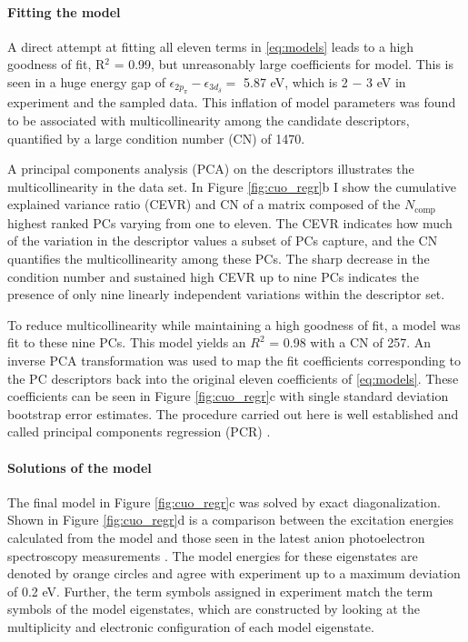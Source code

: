 \documentclass[12pt]{article}
\begin{document}
\vspace{-10pt}
\paragraph{Fitting the model}
A direct attempt at fitting all eleven terms in \eqref{eq:models} leads to a high goodness of fit, R$^2$ = 0.99, but unreasonably large coefficients for model.
This is seen in a huge energy gap of $\epsilon_{2p_\pi} - \epsilon_{3d_\delta} = $ 5.87 eV, which is 2 $-$ 3 eV in experiment and the sampled data.
This inflation of model parameters was found to be associated with multicollinearity among the candidate descriptors, quantified by a large condition number (CN) of 1470.

A principal components analysis (PCA) on the descriptors illustrates the multicollinearity in the data set.
In Figure \eqref{fig:cuo_regr}b I show the cumulative explained variance ratio (CEVR) and CN of a matrix composed of the $N_\text{comp}$ highest ranked PCs varying from one to eleven.
The CEVR indicates how much of the variation in the descriptor values a subset of PCs capture, and the CN quantifies the multicollinearity among these PCs.
The sharp decrease in the condition number and sustained high CEVR up to nine PCs indicates the presence of only nine linearly independent variations within the descriptor set.

To reduce multicollinearity while maintaining a high goodness of fit, a model was fit to these nine PCs.
This model yields an $R^2$ = 0.98 with a CN of 257.
An inverse PCA transformation was used to map the fit coefficients corresponding to the PC descriptors back into the original eleven coefficients of \eqref{eq:models}.
These coefficients can be seen in Figure \ref{fig:cuo_regr}c with single standard deviation bootstrap error estimates.
The procedure carried out here is well established and called principal components regression (PCR) \cite{10.2307/2348005}.

\vspace{-10pt}
\paragraph{Solutions of the model}
The final model in Figure \ref{fig:cuo_regr}c was solved by exact diagonalization.
Shown in Figure \ref{fig:cuo_regr}d is a comparison between the excitation energies calculated from the model and those seen in the latest anion photoelectron spectroscopy measurements \cite{Wu1997}.
The model energies for these eigenstates are denoted by orange circles and agree with experiment up to a maximum deviation of 0.2 eV.
Further, the term symbols assigned in experiment match the term symbols of the model eigenstates, which are constructed by looking at the multiplicity and electronic configuration of each model eigenstate. 
\end{document}
